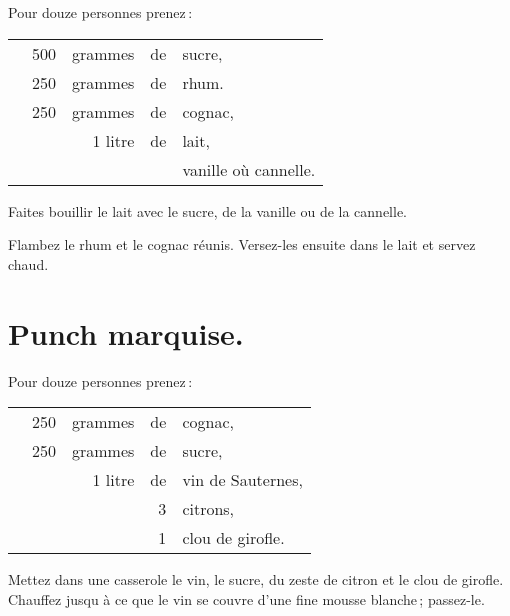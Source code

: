 Pour douze personnes prenez :

\footnotesize
\begin{longtable}{rrrrp{16em}}
  & 500 & grammes & de & sucre,                                                                           \\
  & 250 & grammes & de & rhum.                                                                            \\
  & 250 & grammes & de & cognac,                                                                          \\
  & \multicolumn{2}{r}{1 litre} & de & lait,                                                              \\
  &     &         &    & vanille où cannelle.                                                             \\
\end{longtable}
\normalsize

Faites bouillir le lait avec le sucre, de la vanille ou de la cannelle.

Flambez le rhum et le cognac réunis. Versez-les ensuite dans le lait et servez
chaud.

\section*{\centering Punch marquise.}
{}

Pour douze personnes prenez :

\footnotesize
\begin{longtable}{rrrrp{16em}}
  & 250 & grammes & de & cognac,                                                                          \\
  & 250 & grammes & de & sucre,                                                                           \\
  & \multicolumn{2}{r}{1 litre} & de & vin de Sauternes,                                                  \\
  &     &         &  3 & citrons,                                                                         \\
  &     &         &  1 & clou de girofle.                                                                 \\
\end{longtable}
\normalsize

Mettez dans une casserole le vin, le sucre, du zeste de citron et le clou de
girofle. Chauffez jusqu à ce que le vin se couvre d'une fine mousse blanche ;
passez-le.

